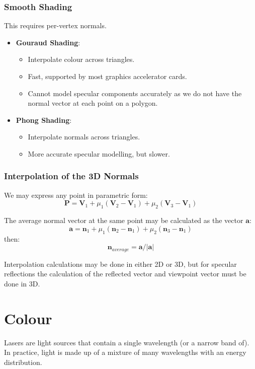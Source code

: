 \documentclass[11pt]{article}
\begin{document}
\subsubsection{Smooth Shading}
This requires per-vertex normals.
\begin{itemize}
  \item \textbf{Gouraud Shading}:
    \begin{itemize}
      \item Interpolate colour across triangles.
      \item Fast, supported by most graphics accelerator cards.
      \item Cannot model specular components accurately as we do not have the normal vector at each point on a polygon.
    \end{itemize}
  \item \textbf{Phong Shading}:
    \begin{itemize}
      \item Interpolate normals across triangles.
      \item More accurate specular modelling, but slower.
    \end{itemize}
\end{itemize}

\subsubsection{Interpolation of the 3D Normals}
We may express any point in parametric form:
\[
  \textbf{P} = \textbf{V}_1 + \mu_1 (\textbf{V}_2 - \textbf{V}_1) + \mu_2 (\textbf{V}_3 - \textbf{V}_1)
\]

The average normal vector at the same point may be calculated as the vector $\textbf{a}$:
\[
  \textbf{a} = \textbf{n}_1 + \mu_1 (\textbf{n}_2 - \textbf{n}_1) + \mu_2 (\textbf{n}_3 - \textbf{n}_1)  
\]
then:
\[
  \textbf{n}_{average} = \textbf{a} / \lvert \textbf{a} \rvert 
\]

Interpolation calculations may be done in either 2D or 3D, but for specular reflections the calculation of the reflected vector and viewpoint vector must be done in 3D.

\section{Colour}
Lasers are light sources that contain a single wavelength (or a narrow band of).
In practice, light is made up of a mixture of many wavelengths with an energy distribution.
\end{document}
